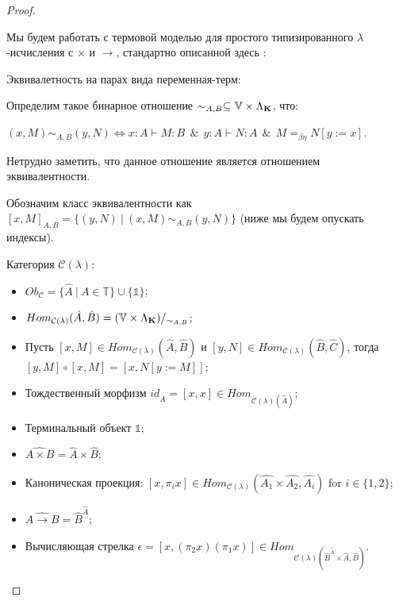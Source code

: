 \begin{proof}

$ $

Мы будем работать с термовой моделью для простого типизированного $\lambda$-исчисления с $\times$ и $\to$, стандартно описанной здесь \cite{LambekScott}:

\begin{defin} Эквивалетность на парах вида переменная-терм:
  $ $

  Определим такое бинарное отношение  $\sim_{A, B} \subseteq \mathbb{V} \times \Lambda_{{\bf K}}$, что:

  $(x, M) \sim_{A, B} (y, N) \Leftrightarrow x : A \vdash M : B \:\: \& \:\: y : A \vdash N : A \:\: \& \:\: M =_{\beta \eta} N [y := x]$.
\end{defin}

Нетрудно заметить, что данное отношение является отношением эквивалентности.

Обозначим класс эквивалентности как $[x, M]_{A, B} = \{ (y, N) \: | \: (x, M) \sim_{A, B} (y, N) \}$ (ниже мы будем опускать индексы).


\begin{defin} Категория $\mathcal{C}(\lambda)$:
\begin{itemize}
  \item $Ob_{\mathcal{C}} = \{ \hat{A} \: | \: A \in \mathbb{T} \} \cup \{ \mathds{1} \}$;
  \item $Hom_{\mathcal{C}(\lambda)}(\hat{A},\hat{B}) = (\mathbb{V} \times \Lambda_{{\bf K}})/_{\sim_{A, B}}$;
  \item Пусть $[x, M] \in Hom_{\mathcal{C}(\lambda)}(\hat{A},\hat{B})$ и $[y,N] \in Hom_{\mathcal{C}(\lambda)}(\hat{B},\hat{C})$, тогда $[y,M] \circ [x, M] = [x, N [y := M]]$;
  \item Тождественный морфизм $id_{\hat{A}} = [x,x] \in Hom_{\mathcal{C}(\lambda)(\hat{A})}$;
  \item Терминальный объект $\mathds{1}$;
  \item $\widehat{A \times B} = \hat{A} \times \hat{B}$;
  \item Каноническая проекция: $[x, \pi_i x] \in Hom_{\mathcal{C}(\lambda)}(\hat{A_1} \times \hat{A_2},\hat{A_i})$ for $i \in \{ 1, 2 \}$;
  \item $\widehat{A \to B} = \hat{B}^{\hat{A}}$;
  \item Вычисляющая стрелка $\epsilon = [x, (\pi_2 x) (\pi_1 x)] \in Hom_{\mathcal{C}(\lambda)(\hat{B}^{\hat{A}} \times \hat{A}, \hat{B})}$.
\end{itemize}
\end{defin}


\end{proof}

